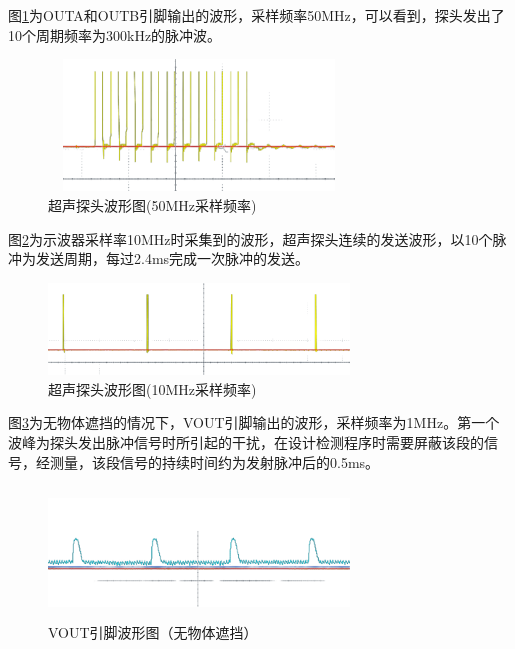 图\ref{超声探头波形图(50MHz采样频率)}为OUTA和OUTB引脚输出的波形，采样频率50MHz，可以看到，探头发出了10个周期频率为300kHz的脉冲波。
\begin{figure}[!h]
	\centering
	\includegraphics[width=8cm,height=3.5cm]{figure/debug waveform3.png}
	\caption{超声探头波形图(50MHz采样频率)}
	\label{超声探头波形图(50MHz采样频率)}
\end{figure}\par

图\ref{超声探头波形图(10MHz采样频率)}为示波器采样率10MHz时采集到的波形，超声探头连续的发送波形，以10个脉冲为发送周期，每过2.4ms完成一次脉冲的发送。
\begin{figure}[!h]
	\centering
	\includegraphics[width=8cm]{figure/debug waveform4.png}
	\caption{超声探头波形图(10MHz采样频率)}
	\label{超声探头波形图(10MHz采样频率)}
\end{figure}\par

\newpage
图\ref{VOUT引脚波形图（无物体遮挡）}为无物体遮挡的情况下，VOUT引脚输出的波形，采样频率为1MHz。第一个波峰为探头发出脉冲信号时所引起的干扰，在设计检测程序时需要屏蔽该段的信号，经测量，该段信号的持续时间约为发射脉冲后的0.5ms。
\begin{figure}[!h]
	\centering
	\includegraphics[width=8cm,height=3.5cm]{figure/debug waveform5.png}
	\caption{VOUT引脚波形图（无物体遮挡）}
	\label{VOUT引脚波形图（无物体遮挡）}
\end{figure}\par

